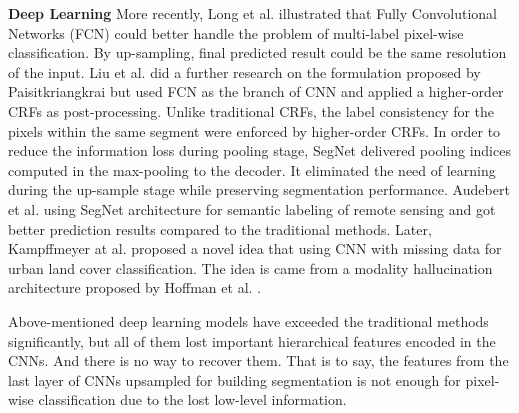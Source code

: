 \textbf{Deep Learning} More recently, Long et al. \cite{IEEEexample:Long_2015_CVPR} illustrated that Fully Convolutional Networks (FCN) could better handle the problem of multi-label pixel-wise classification. 
By up-sampling, final predicted result could be the same resolution of the input. 
Liu et al. \cite{IEEEexample:liu2017dense} did a further research on the formulation proposed by Paisitkriangkrai \cite{IEEEexample:paisitkriangkrai2015effective} but used FCN as the branch of CNN and applied a higher-order CRFs as post-processing.
Unlike traditional CRFs, the label consistency for the pixels within the same segment were enforced by higher-order CRFs. 
In order to reduce the information loss during pooling stage, SegNet \cite{IEEEexample:badrinarayanan2017segnet} delivered pooling indices computed in the max-pooling to the decoder. 
It eliminated the need of learning during the up-sample stage while preserving segmentation performance. 
Audebert et al. \cite{IEEEexample:audebert2017deep} using SegNet architecture for semantic labeling of remote sensing and got better prediction results compared to the traditional methods. 
Later, Kampffmeyer at al. \cite{IEEEexample:kampffmeyer2017urban} proposed a novel idea that using CNN with missing data for urban land cover classification. 
The idea is came from a modality hallucination architecture proposed by Hoffman et al. \cite{IEEEexample:hoffman2016learning}.


Above-mentioned deep learning models have exceeded the traditional methods significantly, but all of them lost important hierarchical features encoded in the CNNs. 
And there is no way to recover them.
That is to say, the features from the last layer of CNNs upsampled for building segmentation is not enough for pixel-wise classification due to the lost low-level information. 


